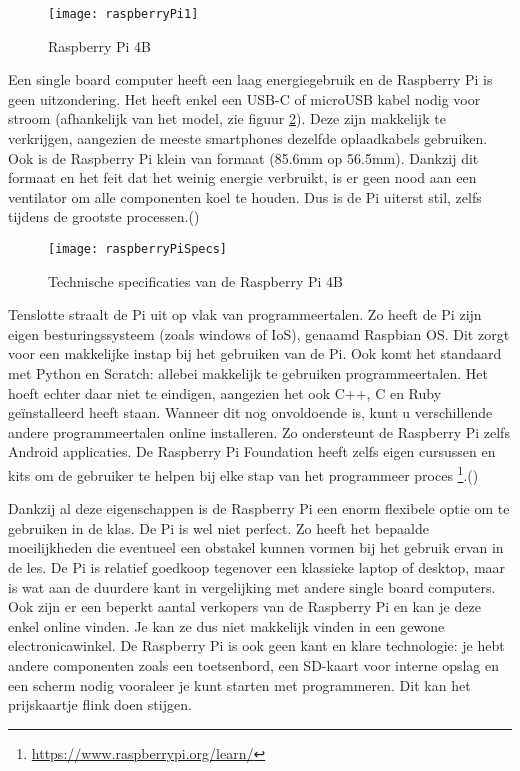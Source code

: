 \begin{figure}
    \texttt{[image: raspberryPi1]}
    \caption{Raspberry Pi 4B}
    \label{fig:raspberry1}
\end{figure}

Een single board computer heeft een laag energiegebruik en de Raspberry Pi is geen uitzondering. Het heeft enkel een USB-C of microUSB kabel nodig voor stroom (afhankelijk van het model, zie figuur \ref{fig:raspberry2}). Deze zijn makkelijk te verkrijgen, aangezien de meeste smartphones dezelfde oplaadkabels gebruiken. Ook is de Raspberry Pi klein van formaat (85.6mm op 56.5mm). Dankzij dit formaat en het feit dat het weinig energie verbruikt, is er geen nood aan een ventilator om alle componenten koel te houden. Dus is de Pi uiterst stil, zelfs tijdens de grootste processen.(\cite{Foundationa}) 

\begin{figure}
    \texttt{[image: raspberryPiSpecs]}
    \caption{Technische specificaties van de Raspberry Pi 4B}
    \label{fig:raspberry2}
\end{figure}

Tenslotte straalt de Pi uit op vlak van programmeertalen. Zo heeft de Pi zijn eigen besturingssysteem (zoals windows of IoS), genaamd Raspbian OS. Dit zorgt voor een makkelijke instap bij het gebruiken van de Pi. Ook komt het standaard met Python en Scratch: allebei makkelijk te gebruiken programmeertalen. Het hoeft echter daar niet te eindigen, aangezien het ook C++, C en Ruby geïnstalleerd heeft staan. Wanneer dit nog onvoldoende is, kunt u verschillende andere programmeertalen online installeren. Zo ondersteunt de Raspberry Pi zelfs Android applicaties. De Raspberry Pi Foundation heeft zelfs eigen cursussen en kits om de gebruiker te helpen bij elke stap van het programmeer proces \footnote{\url{https://www.raspberrypi.org/learn/}}.(\cite{Pattichis2017,Teja2021,Koelling2016})

Dankzij al deze eigenschappen is de Raspberry Pi een enorm flexibele optie om te gebruiken in de klas. De Pi is wel niet perfect. Zo heeft het bepaalde moeilijkheden die eventueel een obstakel kunnen vormen bij het gebruik ervan in de les. 
De Pi is relatief goedkoop tegenover een klassieke laptop of desktop, maar is wat aan de duurdere kant in vergelijking met andere single board computers. Ook zijn er een beperkt aantal verkopers van de Raspberry Pi en kan je deze enkel online vinden. Je kan ze dus niet makkelijk vinden in een gewone electronicawinkel. 
De Raspberry Pi is ook geen kant en klare technologie: je hebt andere componenten zoals een toetsenbord, een SD-kaart voor interne opslag en een scherm nodig vooraleer je kunt starten met programmeren. Dit kan het prijskaartje flink doen stijgen.

